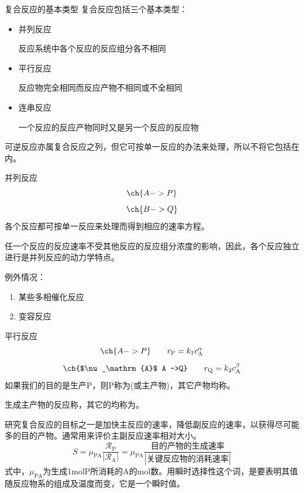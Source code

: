 \begin{frame}{复合反应的基本类型}
	复合反应包括三个基本类型：
	\begin{itemize}
		\item 并列反应\par 反应系统中各个反应的反应组分各不相同
		\item 平行反应\par 反应物完全相同而反应产物不相同或不全相同
		\item 连串反应\par 一个反应的反应产物同时又是另一个反应的反应物
	\end{itemize}
	可逆反应亦属复合反应之列，但它可按单一反应的办法来处理，所以不将它包括在内。
\end{frame}


\begin{frame}{并列反应}
    \[
        \ch{A -> P}
    \]
    \[
        \ch{B -> Q}
    \]
	各个反应都可按单一反应来处理而得到相应的速率方程。
	
    任一个反应的反应速率不受其他反应的反应组分浓度的影响，因此，各个反应独立进行是并列反应的动力学特点。
    \begin{alertblock}
        例外情况：
        \begin{enumerate}
          \item 某些多相催化反应
          \item 变容反应
        \end{enumerate}
    \end{alertblock}
\end{frame}


\begin{frame}{平行反应}
    \[
        \ch{A -> P} \qquad r_\mathrm{P}=k_1c_\mathrm{A}^\alpha
    \]
    \[
        \ch{$\nu_\mathrm{A}$ A ->Q} \qquad r_\mathrm{Q}=k_2c_\mathrm{A}^\beta
    \]
	如果我们的目的是生产P，则P称为(或主产物)，其它产物均称。
	
	生成主产物的反应称，其它的均称为。
	
    研究复合反应的目标之一是加快主反应的速率，降低副反应的速率，以获得尽可能多的目的产物。通常用来评价主副反应速率相对大小。
    \[
        S=\mu_\mathrm{PA}\frac{\mathscr{R}_\mathrm{P}}{|\mathscr{R}_\mathrm{A}|}=\mu_\mathrm{PA}\frac{\mbox{目的产物的生成速率}}{|\mbox{关键反应物的消耗速率}|}
    \]
	式中，$\mu_\mathrm{PA}$为生成1molP所消耗的A的mol数。用瞬时选择性这个词，是要表明其值随反应物系的组成及温度而变，它是一个瞬时值。
\end{frame}


